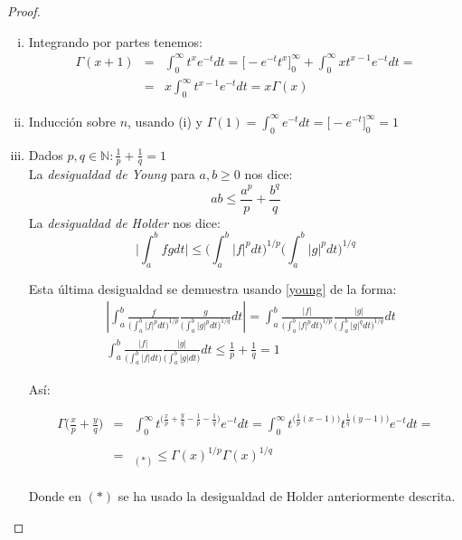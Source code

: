 \documentclass[a4paper, 11pt]{amsart}
\theoremstyle{definition}
\theoremstyle{remark}
\numberwithin{equation}{section}
\begin{document}
   \begin{proof}

     \begin{enumerate}[i.]
      \item Integrando por partes tenemos:
	\begin{eqnarray*}
	\Gamma(x+1) &=& \int_0^{\infty}{t^{x}e^{-t}dt} = \bigg[-e^{-t}t^x\bigg]_0^{\infty} +
	  \int_0^{\infty}{xt^{x-1}e^{-t}dt} = \\
	  & = & x\int_0^{\infty}{t^{x-1}e^{-t}dt} = x\Gamma(x)
	\end{eqnarray*}
      \item Inducción sobre $n$, usando (i) y $\Gamma(1) = \int_0^{\infty}{e^{-t}dt} = 
	\bigg[-e^{-t}\bigg]_0^{\infty} = 1 $
      \item Dados $p,q \in \mathbb{N} : \frac{1}{p} + \frac{1}{q} = 1$\\
      
	La \textit{desigualdad de Young} para $a,b \ge 0$ nos dice: 
	\begin{equation}
	  ab \le \frac{a^p}{p} + \frac{b^q}{q}
	  \label{young}
	\end{equation}
	La \textit{desigualdad de Holder} nos dice: 
	\begin{equation}
	  \bigg|\int_a^b {fg dt}\bigg| \le 
	  \bigg(\int_a^b {|f|^p dt}\bigg)^{1/p} \bigg(\int_a^b {|g|^p dt}\bigg)^{1/q}
	  \label{holder}
	\end{equation}
	
	Esta última desigualdad se demuestra usando \ref{young} de la forma:
	\begin{eqnarray*}
	  &\left|\int_a^b {\frac{f}{\bigg(\int_a^b {|f|^p dt}\bigg)^{1/p}} \frac{g}{\bigg(\int_a^b {|g|^p dt}\bigg)^{1/q}} dt}\right| = 	 
	    \int_a^b {\frac{|f|}{\bigg(\int_a^b {|f|^p dt}\bigg)^{1/p}} \frac{|g|}{\bigg(\int_a^b {|g|^q dt}\bigg)^{1/q}} dt}\\
	  & \int_a^b {\frac{|f|}{\bigg(\int_a^b {|f| dt}\bigg)} \frac{|g|}{\bigg(\int_a^b {|g| dt}\bigg)} dt} \le \frac{1}{p} +\frac{1}{q}= 1
	\end{eqnarray*}

	
	Así:
	
	\begin{eqnarray*}
	 \Gamma\bigg(\frac{x}{p} +\frac{y}{q}\bigg) & = & 
	    \int_0^{\infty}{t^{\big(\frac{x}{p}+\frac{y}{q}
	    -\frac{1}{p}-\frac{1}{q}\big)}e^{-t}dt} 
	    =\int_0^{\infty}{t^{\big(\frac{1}{p}(x-1)\big)} t^{\frac{1}{q}(y-1)\big)}e^{-t}dt} =\\
	    \\
	 & = &_{(*)} \le \Gamma(x)^{1/p}\Gamma(x)^{1/q}
	\end{eqnarray*}\\
	
	Donde en $(*)$ se ha usado la desigualdad de Holder anteriormente descrita.

     \end{enumerate}
      
    \end{proof}
  
\end{document}
